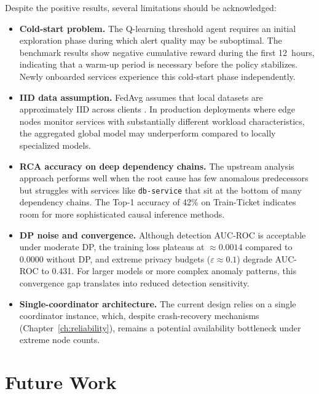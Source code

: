 Despite the positive results, several limitations should be acknowledged:

\begin{itemize}
    \item \textbf{Cold-start problem.} The Q-learning threshold agent requires
    an initial exploration phase during which alert quality may be suboptimal.
    The benchmark results show negative cumulative reward during the first
    12~hours, indicating that a warm-up period is necessary before the policy
    stabilizes. Newly onboarded services experience this cold-start phase
    independently.

    \item \textbf{IID data assumption.} FedAvg assumes that local datasets are
    approximately IID across clients
    \cite{li2020federated, mcmahan2017communication}. In production
    deployments where edge nodes monitor services with substantially different
    workload characteristics, the aggregated global model may underperform
    compared to locally specialized models.

    \item \textbf{RCA accuracy on deep dependency chains.} The upstream
    analysis approach performs well when the root cause has few anomalous
    predecessors but struggles with services like \texttt{db-service} that sit
    at the bottom of many dependency chains. The Top-1 accuracy of 42\% on
    Train-Ticket indicates room for more sophisticated causal inference methods.

    \item \textbf{DP noise and convergence.} Although detection AUC-ROC is
    acceptable under moderate DP, the training loss plateaus at $\approx 0.0014$
    compared to 0.0000 without DP, and extreme privacy budgets ($\varepsilon \approx 0.1$)
    degrade AUC-ROC to 0.431. For larger models or more complex anomaly patterns, this
    convergence gap translates into reduced detection sensitivity.

    \item \textbf{Single-coordinator architecture.} The current design relies
    on a single coordinator instance, which, despite crash-recovery mechanisms
    (Chapter~\ref{ch:reliability}), remains a potential availability bottleneck
    under extreme node counts.
\end{itemize}

\section{Future Work}
\label{sec:conclusion_future}

